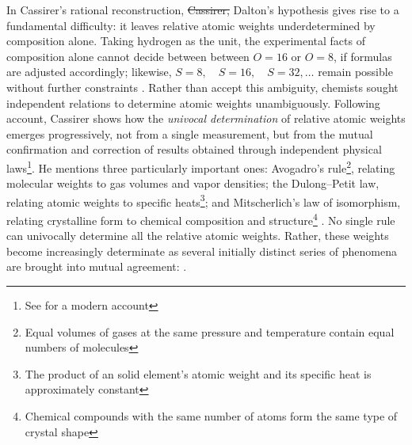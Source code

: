 \documentclass[submitted,12pt]{article}
\providecommand{\DIFdel}[1]{{\protect\color{red}\sout{#1}}}                      %
\providecommand{\DIFdelbegin}{} %
\providecommand{\DIFdelend}{} %
\begin{document}
In Cassirer's rational reconstruction, \DIFdelbegin \DIFdel{Cassirer, }\DIFdelend Dalton's hypothesis gives rise to a fundamental difficulty: it leaves relative atomic weights underdetermined by composition alone. Taking hydrogen as the unit, the experimental facts of composition alone cannot decide between between $O=16$ or $O=8$, if formulas are adjusted accordingly; likewise, $S=8, \quad S=16, \quad S=32, \ldots$ remain possible without further constraints . Rather than accept this ambiguity, chemists sought independent relations to determine atomic weights unambiguously. Following  account, Cassirer shows how the \emph{univocal determination} of relative atomic weights emerges progressively, not from a single measurement, but from the mutual confirmation and correction of results obtained through independent physical laws\footnote{See \cite{Norton2024} for a modern account}. He mentions three particularly important ones: Avogadro's rule\footnote{Equal volumes of gases at the same pressure and temperature contain equal numbers of molecules}, relating molecular weights to gas volumes and vapor densities; the Dulong--Petit law, relating atomic weights to specific heats\footnote{The product of an solid element's atomic weight and its specific heat is approximately constant}; and Mitscherlich's law of isomorphism, relating crystalline form to chemical composition and structure\footnote{Chemical compounds with the same number of atoms form the same type of crystal shape} . No single rule can univocally determine all the relative atomic weights. Rather, these weights become increasingly determinate as several initially distinct series of phenomena are brought into mutual agreement:  .
\end{document}
